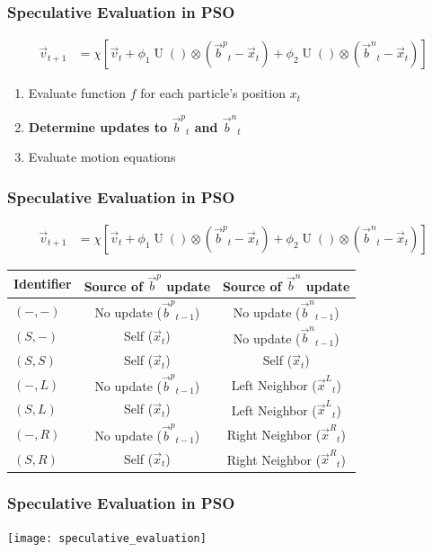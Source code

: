 \documentclass{beamer}
\DeclareMathOperator{\URand}{U}
\providecommand{\ppos}{\ensuremath{\Vec{x}}}
\providecommand{\pvel}{\ensuremath{\Vec{v}}}
\providecommand{\nbest}{\ensuremath{\Vec{b}^n}}
\providecommand{\pbest}{\ensuremath{\Vec{b}^p}}
\providecommand{\constriction}{\ensuremath{\chi}}
\providecommand{\coeff}{\ensuremath{\phi}}
\providecommand{\leftn}{\ensuremath{\Vec{x}^\leftind}}
\providecommand{\rightn}{\ensuremath{\Vec{x}^\rightind}}
\providecommand{\leftind}{\ensuremath{L}}
\providecommand{\rightind}{\ensuremath{R}}
\providecommand{\casexn}{\ensuremath{(S,-)}}
\providecommand{\casexx}{\ensuremath{(S,S)}}
\providecommand{\casexl}{\ensuremath{(S,\leftind)}}
\providecommand{\casexr}{\ensuremath{(S,\rightind)}}
\providecommand{\casepn}{\ensuremath{(-,-)}}
\providecommand{\casepl}{\ensuremath{(-,\leftind)}}
\providecommand{\casepr}{\ensuremath{(-,\rightind)}}
\begin{document}
\begin{frame}
  \frametitle{Speculative Evaluation in PSO}
  \begin{align*}
	  \pvel_{t+1} &=
		  \constriction \left[ \pvel_t +
			  \coeff_1\URand()\otimes(\pbest_t - \ppos_t) +
			  \coeff_2\URand()\otimes(\nbest_t - \ppos_t)
		  \right]
  \end{align*}
  \begin{enumerate}
	\item Evaluate function $f$ for each particle's position $x_t$
	\item \textbf{Determine updates to $\pbest_t$ and $\nbest_t$}
	\item Evaluate motion equations
  \end{enumerate}
\end{frame}

\begin{frame}
  \frametitle{Speculative Evaluation in PSO}
  \begin{align*}
	  \pvel_{t+1} &=
		  \constriction \left[ \pvel_t +
			  \coeff_1\URand()\otimes(\pbest_t - \ppos_t) +
			  \coeff_2\URand()\otimes(\nbest_t - \ppos_t)
		  \right]
  \end{align*}
  \begin{center}
	\begin{tabular}{lcc}
	  Identifier&Source of $\pbest$ update&Source of $\nbest$ update\\
	  \hline
	  \hline
	  $\casepn$&No update ($\pbest_{t-1}$)&No update ($\nbest_{t-1}$)\\
	  \hline
	  $\casexn$&Self ($\ppos_t$)&No update ($\nbest_{t-1}$)\\
	  \hline
	  $\casexx$&Self ($\ppos_t$)&Self ($\ppos_t$)\\
	  \hline
	  $\casepl$&No update ($\pbest_{t-1}$)&Left Neighbor ($\leftn_t$)\\
	  \hline
	  $\casexl$&Self ($\ppos_t$)&Left Neighbor ($\leftn_t$)\\
	  \hline
	  $\casepr$&No update ($\pbest_{t-1}$)&Right Neighbor ($\rightn_t$)\\
	  \hline
	  $\casexr$&Self ($\ppos_t$)&Right Neighbor ($\rightn_t$)\\
	  \hline
	\end{tabular}
  \end{center}
\end{frame}

\begin{frame}
  \frametitle{Speculative Evaluation in PSO}
  \begin{center}
	\texttt{[image: speculative\_evaluation]}
  \end{center}
\end{frame}
\end{document}
